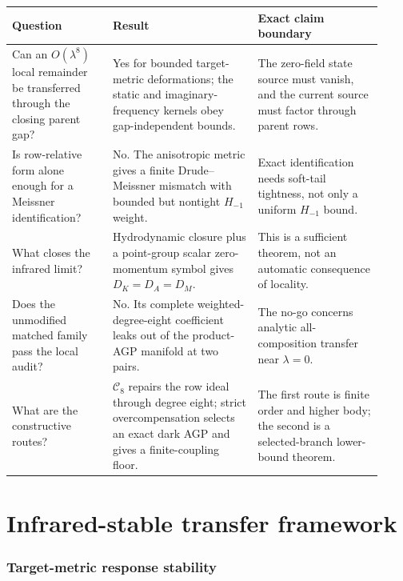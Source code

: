 \documentclass[11pt]{article}
\theoremstyle{definition}
\theoremstyle{remark}
\newcommand{\cC}{\mathcal C}
\begin{document}
\begin{center}
\small
\begin{tabular}{@{}>{\raggedright\arraybackslash}p{0.25\linewidth}>{\raggedright\arraybackslash}p{0.36\linewidth}>{\raggedright\arraybackslash}p{0.31\linewidth}@{}}
\toprule
Question & Result & Exact claim boundary\\
\midrule
Can an $O(\lambda^8)$ local remainder be transferred through the closing
parent gap? & Yes for bounded target-metric deformations; the static and
imaginary-frequency kernels obey gap-independent bounds. & The zero-field
state source must vanish, and the current source must factor through parent
rows.\\
Is row-relative form alone enough for a Meissner identification? & No.  The
anisotropic metric gives a finite Drude--Meissner mismatch with bounded but
nontight $H_{-1}$ weight. & Exact identification needs soft-tail tightness, not
only a uniform $H_{-1}$ bound.\\
What closes the infrared limit? & Hydrodynamic closure plus a point-group
scalar zero-momentum symbol gives $D_K=D_A=D_M$. & This is a sufficient theorem,
not an automatic consequence of locality.\\
Does the unmodified matched family pass the local audit? & No.  Its complete
weighted-degree-eight coefficient leaks out of the product-AGP manifold at two
pairs. & The no-go concerns analytic all-composition transfer near
$\lambda=0$.\\
What are the constructive routes? & $\cC_8$ repairs the row ideal through
degree eight; strict overcompensation selects an exact dark AGP and gives a
finite-coupling floor. & The first route is finite order and higher body; the
second is a selected-branch lower-bound theorem.\\
\bottomrule
\end{tabular}
\end{center}

\part{Infrared-stable transfer framework}

\section{Target-metric response stability}
\label{sec:metric}
\end{document}
